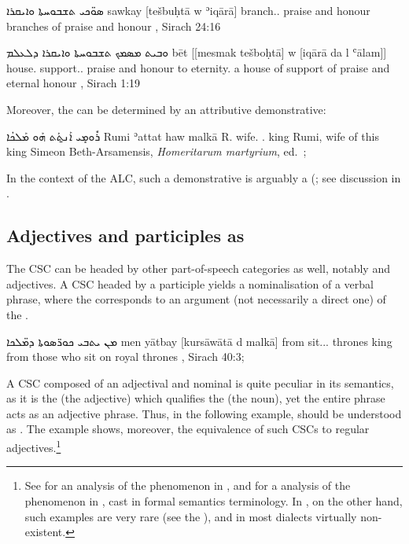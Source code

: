 {
{ܣܘ̈ܟܝ ܬܫܒܘܚܬܐ ܘܐܝܩܪܐ}
{sawkay [tešbuḥtā w\cb{} ʾiqārā]}
{branch.\pl.\cst{} praise and\cb{} honour}
{branches of praise and honour}
{\Pesh, Sirach 24:16 \apud \cite[210]{PeursenBenSira}}


{ܘܒܝܬ ܡܣܡܟ ܬܫܒܘܚܬܐ ܘܐܝܩܪܐ ܕܠܥܠܡ}
{bēt [[mesmak tešboḥtā] w\cb{} [iqārā da\cb{} l\cb{} ʿālam]]}
{house.\cst{} support.\inf.\cst{} praise and\cb{} honour \lnk\cb{} to\cb{} eternity.\abs}
{a house of support of praise and eternal honour}
{\Pesh, Sirach 1:19 \apud \cite[210]{PeursenBenSira}}


Moreover, the \secn can be determined by an attributive demonstrative: 



{ܪܽܘܡܻܝ ܐܰܢ̱ܬܰܬ ܗܰܘ ܡܰܠܟܳܐ}
{Rumi ʾattat haw malkā}
{R. wife.\cst{} \dem.\masc{} king}
{Rumi, wife of this king}
{Simeon Beth-Arsamensis, \textit{Homeritarum martyrium}, ed.\ \cite[368, 2]{AssemanusBibliotheca}; \cite[339, \S 357f]{DuvalSyriaque}\,\footnotemark}

In the context of the ALC, such a demonstrative is arguably a  (\cite[65]{PatElCorrelative}; see discussion in . 

\subsection{Adjectives and participles as \prims}

The CSC can be headed by other part-of-speech categories as well, notably  and adjectives. A CSC headed by a participle yields a nominalisation of a verbal phrase, where the \secn corresponds to an argument (not necessarily a direct one) of the \prim.

{ܡܢ ܝܬܒܝ ܟܘܪ̈ܣܘܬܐ ܕܡ̈ܠܟܐ}
{men yātbay [kursāwātā d\cb{} malkā]}
{from sit.\pl.\prtc.\cst{} thrones \lnk\cb{} king}
{from those who sit on royal thrones}
{\Pesh, Sirach 40:3; \cite[203]{PeursenBenSira}}


A CSC composed of an adjectival \prim and nominal \secn is quite peculiar in its semantics, as it is the \prim (the adjective) which qualifies the \secn (the noun), yet the entire phrase acts as an adjective phrase. Thus, in the following example,  should be understood as . The example shows, moreover, the equivalence of such CSCs to regular adjectives.\footnote{See \citet{GoldenbergAdjectivization} for an analysis of the phenomenon in \Arab, and \citet{DoronAdjectival} for a analysis of the phenomenon in \MHeb, cast in formal semantics terminology. In , on the other hand, such examples are very rare (see the \Qar {}), and in most dialects virtually non-existent.} 

}
